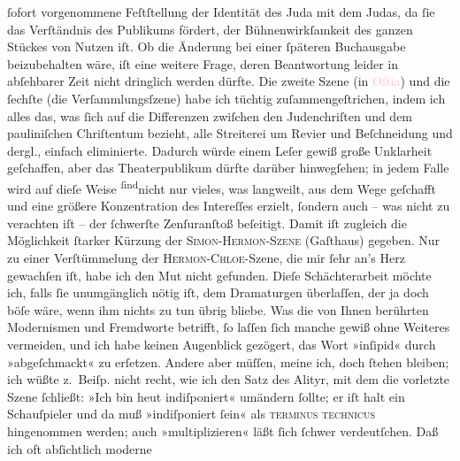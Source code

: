                     ſofort vorgenommene Feſtſtellung der Identität des Juda mit dem Judas, da ſie
                    das Verſtändnis des Publikums fördert, der Bühnenwirkſamkeit des ganzen Stückes
                    von Nutzen iſt. Ob die Änderung bei einer ſpäteren Buchausgabe beizubehalten
                    wäre, iſt eine weitere Frage, deren Beantwortung leider in abſehbarer Zeit nicht
                    dringlich werden dürfte.\pend
           \pstart
           Die zweite Szene (in \textcolor{pink}{Oſtia}{}\ledrightnote{\textcolor{pink}{Ostia Antica}}) und die ſechſte
                    (die Verſammlungsſzene) habe ich tüchtig zuſammengeſtrichen, indem ich alles
                    das, was ſich auf die Differenzen zwiſchen den Judenchriſten und dem
                    pauliniſchen Chriſtentum bezieht, alle Streiterei um Revier und Beſchneidung und
                    dergl., einfach eliminierte. Dadurch würde einem Leſer gewiß große Unklarheit
                    geſchaffen, aber das Theaterpublikum dürfte darüber hinwegſehen; in jedem Falle
                    wird auf dieſe Weise \substVorne{}\textsuperscript{ſind}\substDazwischen{}nicht\substHinten{} nur vieles, was langweilt, aus dem Wege geſchafft und eine größere
                    Konzentration des Intereſſes erzielt, ſondern auch – {\pb}was nicht zu verachten iſt – der
                    ſchwerſte Zenſuranſtoß beſeitigt. Damit iſt zugleich die Möglichkeit ſtarker
                    Kürzung der \textsc{Simon-Hermon-Szene} (Gaſthaus) gegeben. Nur
                    zu einer Verſtümmelung der \textsc{Hermon-Chloe}-Szene, die mir
                    ſehr an’s Herz gewachſen iſt, habe ich den Mut nicht gefunden. Dieſe
                    Schächterarbeit möchte ich, falls ſie unumgänglich nötig iſt, dem Dramaturgen
                    überlaſſen, der ja doch böſe wäre, wenn ihm nichts zu tun übrig bliebe.\pend
           \pstart
           Was die von Ihnen berührten Modernismen und Fremdworte betrifft, ſo laſſen ſich
                    manche gewiß ohne Weiteres vermeiden, und ich habe keinen Augenblick gezögert,
                    das Wort »inſipid« durch »abgeſchmackt« zu erſetzen. Andere aber müſſen, meine
                    ich, doch ſtehen bleiben; ich wüßte z. Beiſp. nicht recht, wie ich den Satz des
                    Alityr, mit dem die vorletzte Szene ſchließt: »Ich bin heut indiſponiert«
                    umändern ſollte; er iſt halt ein Schauſpieler und da muß »indiſponiert ſein« als
                        \textsc{terminus technicus} hingenommen werden; auch
                    »multiplizieren« läßt ſich ſchwer verdeutſchen. Daß ich oft abſichtlich moderne
